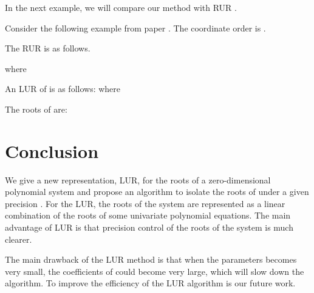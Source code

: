\documentclass[amsthm]{JSC_LaTex_2007_Mar_12/elsart}
\begin{document}
In the next example, we will compare our method with RUR \cite{rur}.
\begin{exmp} Consider the following example from paper \cite{rur}.
 The
coordinate order is .

The RUR is as follows.

where


 An LUR of  is as follows:
{\small }
where
{\small

}

The roots of  are: 

\end{exmp}

\section{Conclusion}
We give a new representation, LUR, for the roots of a
zero-dimensional polynomial system  and propose an
algorithm to isolate the roots of  under a given
precision . For the LUR, the roots of the system are
represented as a linear combination of the roots of some univariate
polynomial equations. The main advantage of LUR is that precision
control of the roots of the system is much clearer.

The main drawback of the LUR method is that when the parameters
 becomes very small, the coefficients of  could become
very large, which will slow down the algorithm. To improve the
efficiency of the LUR algorithm is our future work.
\end{document}
